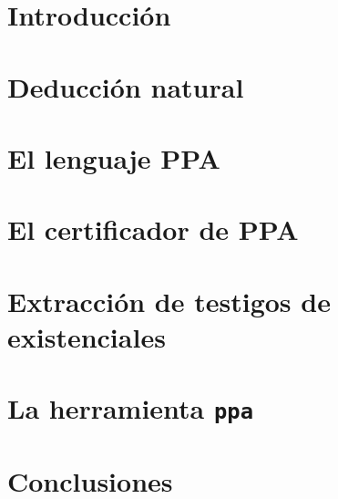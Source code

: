 \documentclass[11pt,a4paper]{tesis}
\begin{document}

\def\autor{Manuel Panichelli}
\def\tituloTesis{
PPA - Un asistente de demostración para lógica de primer orden con extracción de
testigos usando la traducción de Friedman
}
\def\runtitulo{PPA - Un asistente de demostración para lógica de primer orden
con extracción de testigos usando la traducción de Friedman}
\def\runtitle{PPA - a proof-assistant for first-order logic with witness extraction using Friedman's translation}
\def\director{Pablo Barenbaum}
\def\lugar{Buenos Aires, 2024}



\frontmatter
\pagestyle{empty}


\cleardoublepage


\cleardoublepage


\cleardoublepage
\tableofcontents

\mainmatter
\pagestyle{headings}


\chapter{Introducción}



\chapter{Deducción natural}
\label{chap:nd}



\chapter{El lenguaje PPA}



\chapter{El certificador de PPA}
\label{chap:ppa-certifier}



\chapter{Extracción de testigos de existenciales}
\label{chap:witness-extraction}



\chapter{La herramienta \texttt{ppa}}
\label{chap:ppa-tool}



\chapter{Conclusiones}



\backmatter
\printbibliography
\end{document}
